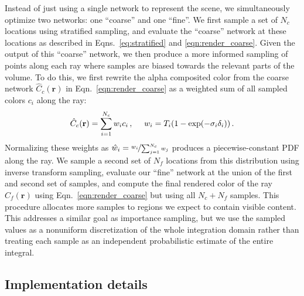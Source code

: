\documentclass[runningheads]{llncs}
\let\originalleft\left
\let\originalright\right
\renewcommand{\left}{\mathopen{}\mathclose\bgroup\originalleft}
\renewcommand{\right}{\aftergroup\egroup\originalright}
\newcommand{\expo}[1]{\exp\left(#1\right)}
\newcommand{\absrp}{\sigma}
\newcommand{\numsamplescoarse}{N_c}
\newcommand{\numsamplesfine}{N_f}
\newcommand{\deltatime}{\delta}
\newcommand{\ray}{\mathbf{r}}
\newcommand{\Ccoarse}{\hat{C}_c(\ray)}
\newcommand{\Cfine}{\hat{C}_f(\ray)}
\newcommand{\pweight}{w}
\newcommand{\normpweight}{\hat{w}}
\begin{document}
Instead of just using a single network to represent the scene, we simultaneously optimize two networks: one ``coarse'' and one ``fine''.
We first sample a set of $\numsamplescoarse$ locations using stratified sampling, and evaluate the ``coarse'' network at these locations as described in Eqns.~\ref{eq:stratified} and \ref{eqn:render_coarse}. Given the output of this ``coarse'' network, we then produce a more informed sampling of points along each ray where samples are biased towards the relevant parts of the volume. To do this, we first rewrite the alpha composited color from the coarse network $\Ccoarse$ in Eqn.~\ref{eqn:render_coarse} as a weighted sum of all sampled colors $c_i$ along the ray:
\begin{equation}
  \Ccoarse=\sum_{i=1}^{\numsamplescoarse}\pweight_i c_i\,, \quad\,\,
  \pweight_i = T_i(1-\expo{-\absrp_i \deltatime_i})\,.
  \label{eqn:weights}
\end{equation}
Normalizing these weights as $\normpweight_i = \nicefrac{\pweight_i}{\sum_{j=1}^{\numsamplescoarse} \pweight_j}$ produces a piecewise-constant PDF along the ray.
We sample a second set of $\numsamplesfine$ locations from this distribution using inverse transform sampling, evaluate our ``fine'' network at the union of the first and second set of samples, and compute the final rendered color of the ray $\Cfine$ using Eqn.~\ref{eqn:render_coarse} but using all $\numsamplescoarse+\numsamplesfine$ samples. This procedure allocates more samples to regions we expect to contain visible content. This addresses a similar goal as importance sampling, but we use the sampled values as a nonuniform discretization of the whole integration domain rather than treating each sample as an independent probabilistic estimate of the entire integral.

\subsection{Implementation details}
\end{document}
